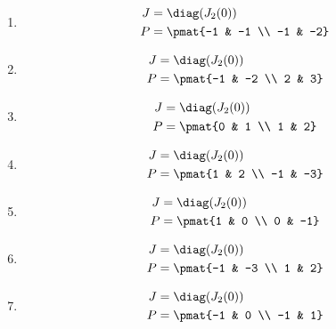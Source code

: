 \begin{enumerate}

\item

\begin{align*}
J &= \diag(J_{2}(0))\\
P &= \pmat{-1 & -1 \\ -1 & -2}
\end{align*}

\item

\begin{align*}
J &= \diag(J_{2}(0))\\
P &= \pmat{-1 & -2 \\ 2 & 3}
\end{align*}

\item

\begin{align*}
J &= \diag(J_{2}(0))\\
P &= \pmat{0 & 1 \\ 1 & 2}
\end{align*}

\item

\begin{align*}
J &= \diag(J_{2}(0))\\
P &= \pmat{1 & 2 \\ -1 & -3}
\end{align*}

\item

\begin{align*}
J &= \diag(J_{2}(0))\\
P &= \pmat{1 & 0 \\ 0 & -1}
\end{align*}

\item

\begin{align*}
J &= \diag(J_{2}(0))\\
P &= \pmat{-1 & -3 \\ 1 & 2}
\end{align*}

\item

\begin{align*}
J &= \diag(J_{2}(0))\\
P &= \pmat{-1 & 0 \\ -1 & 1}
\end{align*}


\end{enumerate}
